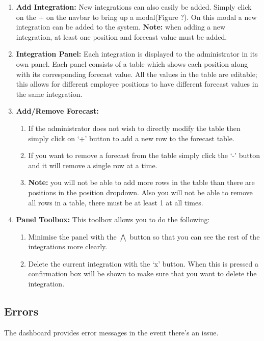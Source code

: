 \documentclass[11pt,a4paper]{article}
\begin{document}
\begin{enumerate}
	\item \textbf{Add Integration:} New integrations can also easily be added. Simply click on the + on the navbar to bring up a modal(Figure ?). On this modal a new integration can be added to the system. \textbf{Note:} when adding a new integration, at least one position and forecast value must be added.
	\item \textbf{Integration Panel: } Each integration is displayed to the administrator in its own panel. Each panel consists of a table which shows each position along with its corresponding forecast value. All the values in the table are editable; this allows for different employee positions to have different forecast values in the same integration. 
	\item \textbf{Add/Remove Forecast:} 
	\begin{enumerate}
		\item If the administrator does not wish to directly modify the table then simply click on `+' button to add a new row to the forecast table.
		\item If you want to remove a forecast from the table simply click the `-' button and it will remove a single row at a time.
		\item \textbf{Note:} you will not be able to add more rows in the table than there are positions in the position dropdown. Also you will not be able to remove all rows in a table, there must be at least 1 at all times. 
	\end{enumerate} 
	\item \textbf{Panel Toolbox:} This toolbox allows you to do the following:
	\begin{enumerate}
		\item Minimise the panel with the $\bigwedge$ button so that you can see the rest of the integrations more clearly.
		\item Delete the current integration with the `x' button. When this is pressed a confirmation box will be shown to make sure that you want to delete the integration. 
	\end{enumerate}  
\end{enumerate}

\subsection{Errors}

The dashboard provides error messages in the event there's an issue.
\end{document}
